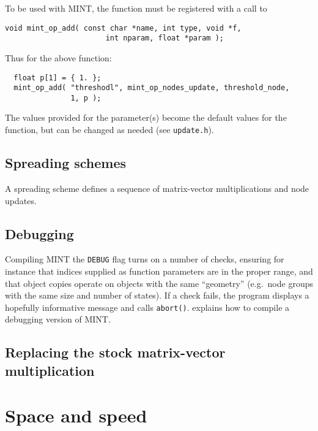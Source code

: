 \documentclass[12pt,letterpaper]{memoir}
\newcommand{\mint}{MINT\xspace}
\begin{document}
To be used with \mint, the function must be registered with a call
to
\begin{lstlisting}
void mint_op_add( const char *name, int type, void *f, 
                       int nparam, float *param );
\end{lstlisting}
Thus for the above function:
\begin{lstlisting}
  float p[1] = { 1. };
  mint_op_add( "threshodl", mint_op_nodes_update, threshold_node, 
               1, p );
\end{lstlisting}
The values provided for the parameter(s) become the default values for
the function, but can be changed as needed (see \lstinline{update.h}).

\section{Spreading schemes}
\label{sec:spreading}

A spreading scheme defines a sequence of matrix-vector multiplications
and node updates.


\section{Debugging}
\label{sec:debugging}

Compiling \mint the \lstinline{DEBUG} flag turns on a number of
checks, ensuring for instance that indices supplied as function
parameters are in the proper range, and that object copies operate on
objects with the same ``geometry'' (e.g.\ node groups with the same
size and number of states).  If a check fails, the program displays a
hopefully informative message and calls \lstinline{abort()}.
 explains how to compile a debugging version of
\mint.


\section{Replacing the stock matrix-vector multiplication}
\label{sec:mvm}

\chapter{Space and speed}
\label{chap:details}
\end{document}
